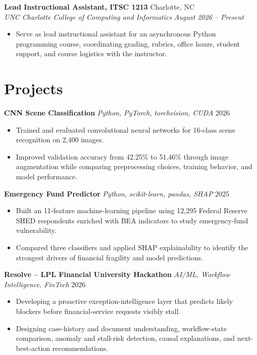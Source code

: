 \documentclass[letterpaper,10pt]{article}
\newcommand{\resumeentry}[4]{
  \noindent\textbf{#1} \hfill #2 \\
  \textit{#3} \hfill \textit{#4}
}
\newcommand{\projectentry}[3]{
  \noindent\textbf{#1} \textbar{} \textit{#2} \hfill #3
}
\begin{document}
\smallskip

\resumeentry
  {Lead Instructional Assistant, ITSC 1213}{Charlotte, NC}
  {UNC Charlotte College of Computing and Informatics}{August 2026 -- Present}
\begin{itemize}
  \item Serve as lead instructional assistant for an asynchronous Python programming course, coordinating grading, rubrics, office hours, student support, and course logistics with the instructor.
\end{itemize}

\section{Projects}

\projectentry
  {CNN Scene Classification}
  {Python, PyTorch, torchvision, CUDA}
  {2026}
\begin{itemize}
  \item Trained and evaluated convolutional neural networks for 16-class scene recognition on 2,400 images.
  \item Improved validation accuracy from 42.25\% to 51.46\% through image augmentation while comparing preprocessing choices, training behavior, and model performance.
\end{itemize}

\smallskip

\projectentry
  {Emergency Fund Predictor}
  {Python, scikit-learn, pandas, SHAP}
  {2025}
\begin{itemize}
  \item Built an 11-feature machine-learning pipeline using 12,295 Federal Reserve SHED respondents enriched with BEA indicators to study emergency-fund vulnerability.
  \item Compared three classifiers and applied SHAP explainability to identify the strongest drivers of financial fragility and model predictions.
\end{itemize}

\smallskip

\projectentry
  {Resolve -- LPL Financial University Hackathon}
  {AI/ML, Workflow Intelligence, FinTech}
  {2026}
\begin{itemize}
  \item Developing a proactive exception-intelligence layer that predicts likely blockers before financial-service requests visibly stall.
  \item Designing case-history and document understanding, workflow-state comparison, anomaly and stall-risk detection, causal explanations, and next-best-action recommendations.
\end{itemize}
\end{document}
